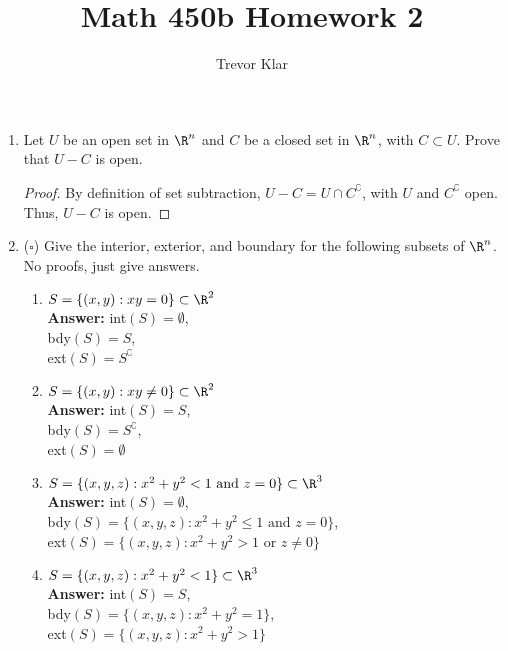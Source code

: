 \documentclass[letterpaper]{article}
\title{Math 450b \linebreak
Homework 2}
\author{Trevor Klar}
\begin{document}
\maketitle

\begin{enumerate}
\item Let $U$ be an open set in $\R^n$ and $C$ be a closed set in $\R^n$, with $C\subset U$. Prove that $U-C$ is open. 

\begin{proof}
By definition of set subtraction, $U-C=U\cap C^\complement$, with $U$ and $C^\complement$ open. Thus, $U-C$ is open. 
\end{proof}

\item ($\square$) Give the interior, exterior, and boundary for the following subsets of $\R^n$. No proofs, just give answers.

	\begin{multicols}{2}	
	\begin{enumerate}[label=(\alph*)]
	\item $S = \{(x,y):xy=0\}\subset\R^2$\\
	\textbf{Answer:} int$(S) = \emptyset$, \\bdy$(S) = S$, \\ext$(S) = S^\complement$ 
	\qedwhite
	
	\item $S = \{(x,y):xy\neq0\}\subset\R^2$\\
	\textbf{Answer:} int$(S) = S$, \\bdy$(S) = S^\complement$, \\ext$(S) = \emptyset$ 
	\qedwhite
	
	\item $S = \{(x,y,z):x^2+y^2<1 \text{ and } z=0\}\subset\R^3$\\
	\textbf{Answer:} int$(S) = \emptyset$, \\bdy$(S) = \{(x,y,z):x^2+y^2\leq1 \text{ and } z=0\}$, \\ext$(S) = \{(x,y,z):x^2+y^2>1 \text{ or } z\neq0\}$ 
	\qedwhite
	
	\item $S = \{(x,y,z):x^2+y^2<1\}\subset\R^3$\\
	\textbf{Answer:} int$(S) = S$, \\bdy$(S) = \{(x,y,z):x^2+y^2=1\}$, \\ext$(S) = \{(x,y,z):x^2+y^2>1\}$ 
	\qedwhite
	\end{enumerate}
	\end{multicols}
	

\end{enumerate}
\end{document}
